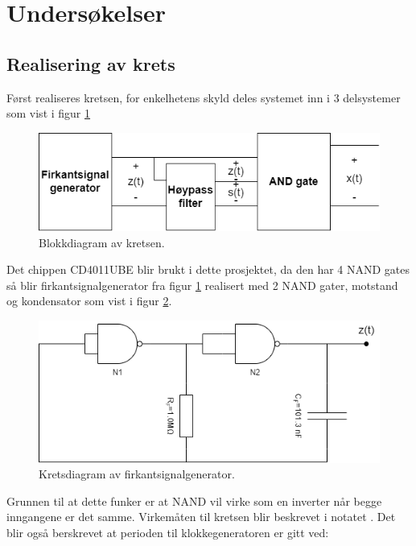 \section{Undersøkelser}
\label{sec:concept}


\subsection{Realisering av krets}
\label{subsec:realisering_av_krets}

Først realiseres kretsen, for enkelhetens skyld deles systemet inn i 3 delsystemer som vist i figur \ref{fig:blockdiagram}

\begin{figure}[!hbt]
	\centering
	\includegraphics[scale=0.5]{./Images/02Concept/01blokkdiagram.png}
	\caption{Blokkdiagram av kretsen.}
    \label{fig:blockdiagram}
\end{figure}

Det chippen CD4011UBE blir brukt i dette prosjektet, da den har 4 NAND gates så blir firkantsignalgenerator fra figur \ref{fig:blockdiagram} realisert med 2 NAND gater, motstand og kondensator som vist i figur \ref{fig:firkantsignalgenerator}.

\begin{figure}[!hbt]
	\centering
	\includegraphics[scale=0.5]{./Images/02Concept/02firkantsignal.png}
	\caption{Kretsdiagram av firkantsignalgenerator.}
    \label{fig:firkantsignalgenerator}
\end{figure}

Grunnen til at dette funker er at NAND vil virke som en inverter når begge inngangene er det samme. Virkemåten til kretsen blir beskrevet i notatet \cite{instituttforelektroniskesystemntnu_2022_ertykt}. Det blir også berskrevet at perioden til klokkegeneratoren er gitt
ved:

